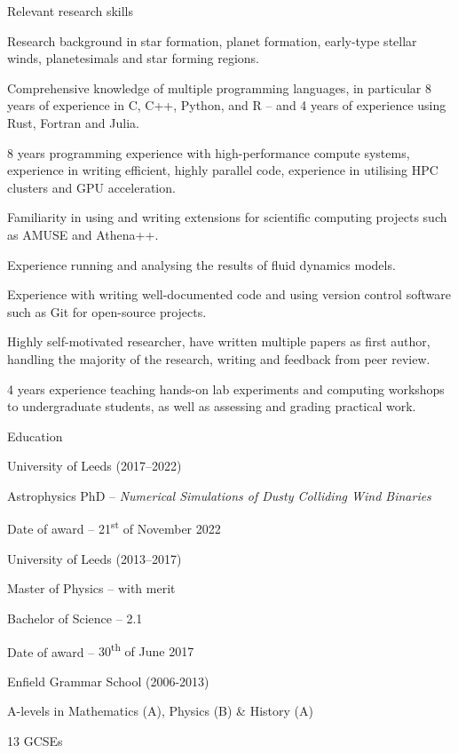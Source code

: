 \documentclass{resume} %
\begin{document}
\begin{rSection}{Relevant research skills}
	\begin{rPoints}{}
		\item Research background in star formation, planet formation, early-type stellar winds, planetesimals and star forming regions.
		\item Comprehensive knowledge of multiple programming languages, in particular 8 years of experience in C, C++, Python, and R -- and 4 years of experience using Rust, Fortran and Julia.
		\item 8 years programming experience with high-performance compute systems, experience in writing efficient, highly parallel code, experience in utilising HPC clusters and GPU acceleration.
		\item Familiarity in using and writing extensions for scientific computing projects such as {AMUSE} and {Athena++}.
		\item Experience running and analysing the results of fluid dynamics models.
		\item Experience with writing well-documented code and using version control software such as {Git} for open-source projects.
		\item Highly self-motivated researcher, have written multiple papers as first author, handling the majority of the research, writing and feedback from peer review. 
		\item 4 years experience teaching hands-on lab experiments and computing workshops to undergraduate students, as well as assessing and grading practical work.
	\end{rPoints}
\end{rSection}

\begin{rSection}{Education}
	\begin{rPoints}{University of Leeds (2017--2022)}
		\item Astrophysics PhD -- {\sl Numerical Simulations of Dusty Colliding Wind Binaries}
		\item Date of award -- {21\textsuperscript{st} of November 2022} 
	\end{rPoints}
	\begin{rPoints}{University of Leeds (2013--2017)}
		\item {Master of Physics} -- {with merit}
		\item {Bachelor of Science} -- {2.1}
		\item Date of award -- {30\textsuperscript{th} of June 2017}
	\end{rPoints}
	\begin{rPoints}{Enfield Grammar School (2006-2013)}
		\item A-levels in Mathematics (A), Physics (B) \& History (A)
		\item 13 GCSEs
	\end{rPoints}
\end{rSection}
\end{document}
